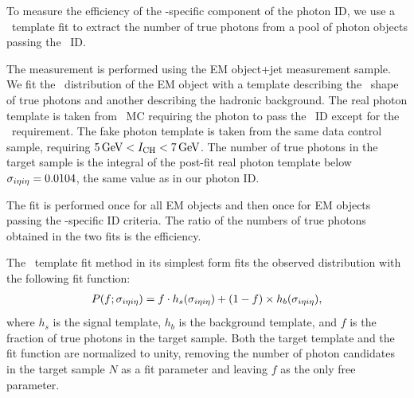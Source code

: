 To measure the efficiency of the \Pgg-specific component of the photon ID, we use a \sieie\ template fit to extract the number of true photons from a pool of photon objects passing the \egamma\ ID.

The measurement is performed using the EM object+jet measurement sample. 
We fit the \sieie\ distribution of the EM object with a template describing the \sieie\ shape of true photons and another describing the hadronic background. 
The real photon template is taken from \gj\ MC requiring the photon to pass the \egamma\ ID except for the \sieie\ requirement.
The fake photon template is taken from the same data control sample, requiring $5\,\text{Ge\hspace{-.08em}V} < I_{\text{CH}} < 7\,\text{Ge\hspace{-.08em}V}$.
The number of true photons in the target sample is the integral of the post-fit real photon template below $\sigma_{i\eta i\eta} = 0.0104$, the same value as in our photon ID. 

The fit is performed once for all EM objects and then once for EM objects passing the \Pgg-specific ID criteria. 
The ratio of the numbers of true photons obtained in the two fits is the efficiency.

The \sieie\ template fit method in its simplest form fits the observed distribution with the following fit function:
\begin{align}
  P(f;\sigma_{i\eta i\eta}) = f \cdot h_{s}(\sigma_{i\eta i\eta}) + (1 - f) \times h_{b}(\sigma_{i\eta i\eta}),
\end{align}
where $h_{s}$ is the signal template, $h_{b}$ is the background template, and $f$ is the fraction of true photons in the target sample. 
Both the target template and the fit function are normalized to unity, removing the number of photon candidates in the target sample $N$ as a fit parameter and leaving $f$ as the only free parameter.

